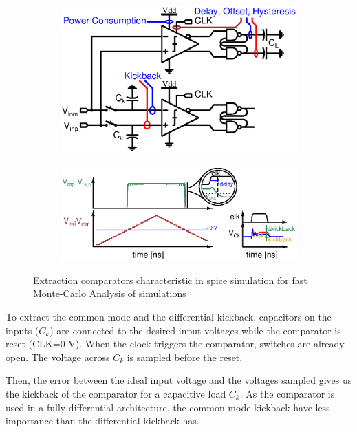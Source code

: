 \begin{figure}[htp]
    \centering
    \begin{subfigure}[b]{0.40\textwidth}
        \centering
        \includegraphics[width=\textwidth]{Chapter7/Figs/cmp_tb.ps}
        \label{fig:cmp_tb}
    \end{subfigure}
    \begin{subfigure}[b]{0.58\textwidth}
        \centering
        \includegraphics[width=\textwidth]{Chapter7/Figs/cmp_tb_signals.ps}
        \label{fig:test_signals}
    \end{subfigure}
    \caption{Extraction comparators characteristic in spice simulation for fast Monte-Carlo Analysis of simulations}
    \label{fig:cmp_testbench}
\end{figure}

To extract the common mode and the differential kickback, capacitors on the inputs (\(C_{k}\)) are connected to the desired input voltages while the comparator is reset (CLK=0 V). When the clock triggers the comparator, switches are already open. The voltage across \(C_{k}\) is sampled before the reset.

Then, the error between the ideal input voltage and the voltages sampled gives us the kickback of the comparator for a capacitive load \(C_{k}\). As the comparator is used in a fully differential architecture, the common-mode kickback have less importance than the differential kickback has.

